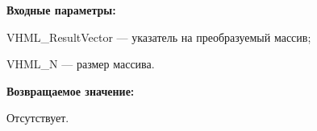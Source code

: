 \textbf{Входные параметры:}  
 
VHML\_ResultVector --- указатель на преобразуемый массив;
 
VHML\_N --- размер массива.

\textbf{Возвращаемое значение:}

Отсутствует.